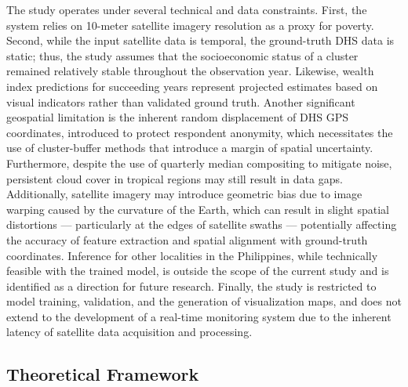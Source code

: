 \documentclass[12pt, letterpaper]{article}
\numberwithin{figure}{section}
\numberwithin{table}{section}
\begin{document}
The study operates under several technical and data constraints.
First, the system relies on 10-meter satellite imagery resolution
as a proxy for poverty. Second, while the input satellite data is
temporal, the ground-truth DHS data is static; thus, the study
assumes that the socioeconomic status of a cluster remained
relatively stable throughout the observation year. Likewise, wealth
index predictions for succeeding years represent projected
estimates based on visual indicators rather than validated ground
truth. Another significant geospatial limitation is the inherent
random displacement of DHS GPS coordinates, introduced to protect
respondent anonymity, which necessitates the use of cluster-buffer
methods that introduce a margin of spatial uncertainty.
Furthermore, despite the use of quarterly median compositing to
mitigate noise, persistent cloud cover in tropical regions may
still result in data gaps. Additionally, satellite imagery may
introduce geometric bias due to image warping caused by the
curvature of the Earth, which can result in slight spatial
distortions — particularly at the edges of satellite swaths —
potentially affecting the accuracy of feature extraction and
spatial alignment with ground-truth coordinates. Inference for
other localities in the
Philippines, while technically feasible with the trained model, is
outside the scope of the current study and is identified as a
direction for future research. Finally, the study is restricted to
model training, validation, and the generation of visualization
maps, and does not extend to the development of a real-time
monitoring system due to the inherent latency of satellite data
acquisition and processing.

\subsection{Theoretical Framework}
\end{document}
